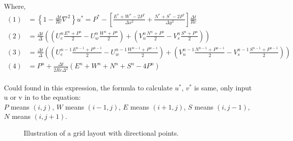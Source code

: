\documentclass[12pt]{article}
\begin{document}
Where,
\begin{align*}
    (1) &= \left\{ 1 - \frac{\Delta t}{Re} \nabla^2 \right\} u^{*} = P^{*} - \left[\frac{E^{*} + W^{*} - 2P^*}{\Delta x^{2}} + \frac{N^{*} + S^{*} - 2P^*}{\Delta y^{2}}\right] \frac{\Delta t}{Re} \\
    (2) &= \frac{\Delta t}{\Delta} \left((U_{e}^{n} \frac{ E^{n} + P^{n}}{2} - U_{w}^{n} \frac{ W^{n} + P^{n}}{2}) + (V_{n}^{n} \frac{ N^{n} + P^{n}}{2} - V_{s}^{n} \frac{ S^{n} + P^{n}}{2}) \right) \\
    (3) &= \frac{\Delta t}{\Delta} \left((U_{e}^{n-1} \frac{ E^{n-1} + P^{n-1}}{2} - U_{w}^{n-1} \frac{ W^{n-1} + P^{n-1}}{2}) + (V_{n}^{n-1} \frac{ N^{n-1} + P^{n-1}}{2} - V_{s}^{n-1} \frac{ S^{n-1} + P^{n-1}}{2}) \right) \\
    (4) &= P^n + \frac{\Delta t}{2 Re \Delta^2} \left( E^{n} + W^{n} + N^{n} + S^{n} - 4P^{n} \right)
\end{align*}\\


    Could found in this expression, the formula to calculate $u^*$, $v^*$ is same, only input u or v in to the equation:\\

    $P$ means $(i,j)$, $W$ means $(i-1,j)$, $E$ means $(i+1,j)$, $S$ means $(i,j-1)$, $N$ means $(i,j+1)$.\\




\begin{figure}[H]
\centering
{}
\caption{Illustration of a grid layout with directional points.}
\end{figure}
\end{document}
